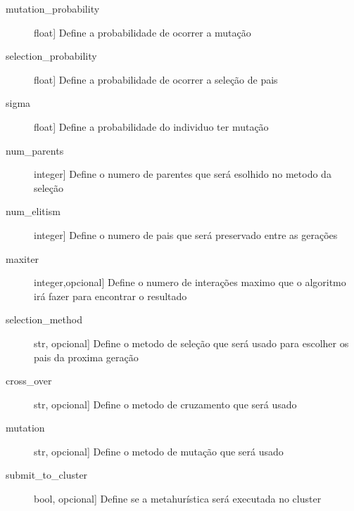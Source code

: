 \documentclass[letterpaper,10pt,english]{sphinxmanual}
\begin{document}
\begin{fulllineitems}
\begin{description}
\item[{mutation\_probability}] \leavevmode{[}float{]}
Define a probabilidade de ocorrer a mutação

\item[{selection\_probability}] \leavevmode{[}float{]}
Define a probabilidade de ocorrer a seleção de pais

\item[{sigma}] \leavevmode{[}float{]}
Define a probabilidade do individuo ter mutação

\item[{num\_parents}] \leavevmode{[}integer{]}
Define o numero de parentes que será esolhido no metodo da seleção

\item[{num\_elitism}] \leavevmode{[}integer{]}
Define o numero de pais que será preservado entre as gerações

\item[{maxiter}] \leavevmode{[}integer,opcional{]}
Define o numero de interações maximo que o algoritmo irá fazer para encontrar o resultado

\item[{selection\_method}] \leavevmode{[}str, opcional{]}
Define o metodo de seleção que será usado para escolher os pais da proxima geração

\item[{cross\_over}] \leavevmode{[}str, opcional{]}
Define o metodo de cruzamento que será usado

\item[{mutation}] \leavevmode{[}str, opcional{]}
Define o metodo de mutação que será usado

\item[{submit\_to\_cluster}] \leavevmode{[}bool, opcional{]}
Define se a meta\sphinxhyphen{}hurística será executada no cluster

\end{description}


\end{fulllineitems}
\end{document}
